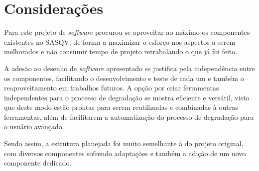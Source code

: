 \section{Considerações}

Para este projeto de \emph{software} procurou-se aproveitar ao máximo os componentes existentes no SASQV, de forma a maximizar o esforço nos aspectos a serem melhorados e não consumir tempo de projeto retrabalando o que já foi feito. 

A adesão ao desenho de \emph{software} apresentado se justifica pela independência entre os componentes, facilitando o desenvolvimento e teste de cada um e também o reaproveitamento em trabalhos futuros.
A opção por criar ferramentas independentes para o processo de degradação se mostra eficiente e versátil, visto que deste modo estão prontas para serem reutilizadas e combinadas à outras ferramentas, além de facilitarem a automatização do processo de degradação para o usuário avançado.

Sendo assim, a estrutura planejada foi muito semelhante à do projeto original, com diversos componentes sofrendo adaptações e também a adição de um novo componente dedicado.

